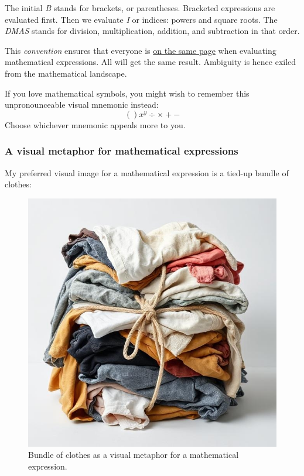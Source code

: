\documentclass[
  a4paper,
]{article}
\begin{document}
The initial \emph{B} stands for brackets, or parentheses. Bracketed
expressions are evaluated first. Then we evaluate \emph{I} or indices:
powers and square roots. The \emph{DMAS} stands for division,
multiplication, addition, and subtraction in that order.

This \emph{convention} ensures that everyone is
\href{https://www.gingersoftware.com/content/phrases/on-the-same-page}{on
the same page} when evaluating mathematical expressions. All will get
the same result. Ambiguity is hence exiled from the mathematical
landscape.

If you love mathematical symbols, you might wish to remember this
unpronounceable visual mnemonic instead: \[
()x^y\div\times+-
\] Choose whichever mnemonic appeals more to you.

\subsubsection{A visual metaphor for mathematical
expressions}\label{a-visual-metaphor-for-mathematical-expressions}

My preferred visual image for a mathematical expression is a tied-up
bundle of clothes:

\begin{figure}
\centering
\includegraphics[width=0.8\linewidth,height=\textheight,keepaspectratio]{images/bundle-of-clothes-in-disarray.jpg}
\caption{Bundle of clothes as a visual metaphor for a mathematical
expression.}\label{fig:clothes-bundle}
\end{figure}
\end{document}
